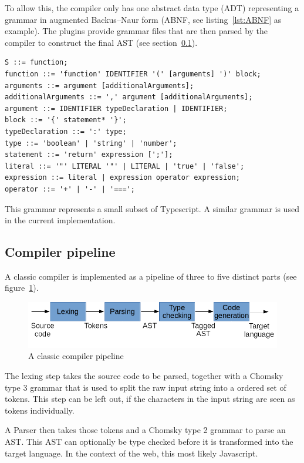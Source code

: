 To allow this, the compiler only has one abstract data type (ADT) representing a grammar in  augmented Backus--Naur form (ABNF, see listing~\ref{lst:ABNF} as example). The plugins provide grammar files that are then parsed by the compiler to construct the final AST (see section~\ref{sec:pipeline}).

\begin{lstlisting}[linewidth=\columnwidth, caption={Simple example of ABNF grammar}, captionpos=b, label=lst:ABNF]
S ::= function;
function ::= 'function' IDENTIFIER '(' [arguments] ')' block;
arguments ::= argument [additionalArguments];
additionalArguments ::= ',' argument [additionalArguments];
argument ::= IDENTIFIER typeDeclaration | IDENTIFIER;
block ::= '{' statement* '}';
typeDeclaration ::= ':' type;
type ::= 'boolean' | 'string' | 'number';
statement ::= 'return' expression [';'];
literal ::= '"' LITERAL '"' | LITERAL | 'true' | 'false';
expression ::= literal | expression operator expression;
operator ::= '+' | '-' | '===';
\end{lstlisting}

This grammar represents a small subset of Typescript. A similar grammar is used in the current implementation.

\subsection{Compiler pipeline}
\label{sec:pipeline}

A classic compiler is implemented as a pipeline of three to five distinct parts (see figure~\ref{fig:compiler_pipeline}).

\begin{figure}[H]
\includegraphics[width=\columnwidth]{./compiler_pipeline.png}
\caption{A classic compiler pipeline}%
\label{fig:compiler_pipeline}
\end{figure}

The lexing step takes the source code to be parsed, together with a Chomsky type 3 grammar that is used to split the raw input string into a ordered set of tokens. This step can be left out, if the characters in the input string are seen as tokens individually.

A Parser then takes those tokens and a Chomsky type 2 grammar to parse an AST\@. This AST can optionally be type checked before it is transformed into the target language. In the context of the web, this most likely Javascript.

